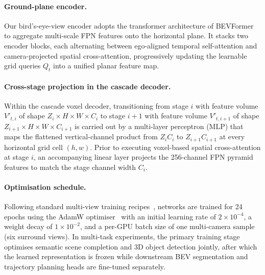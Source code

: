 \paragraph{Ground-plane encoder.} Our bird's-eye-view encoder adopts the transformer architecture of BEVFormer~\cite{li2022bevformer} to aggregate multi-scale FPN features onto the horizontal plane. It stacks two encoder blocks, each alternating between ego-aligned temporal self-attention and camera-projected spatial cross-attention, progressively updating the learnable grid queries $Q_t$ into a unified planar feature map.

\paragraph{Cross-stage projection in the cascade decoder.} Within the cascade voxel decoder, transitioning from stage $i$ with feature volume $V'_{t,i}$ of shape $Z_i\times H\times W\times C_i$ to stage $i+1$ with feature volume $V'_{t,i+1}$ of shape $Z_{i+1}\times H\times W\times C_{i+1}$ is carried out by a multi-layer perceptron (MLP) that maps the flattened vertical-channel product from $Z_i C_i$ to $Z_{i+1} C_{i+1}$ at every horizontal grid cell $(h,w)$. Prior to executing voxel-based spatial cross-attention at stage $i$, an accompanying linear layer projects the 256-channel FPN pyramid features to match the stage channel width $C_i$.

\paragraph{Optimisation schedule.} Following standard multi-view training recipes~\cite{li2022bevformer,wang2021fcos3d}, networks are trained for 24 epochs using the AdamW optimiser~\cite{loshchilov2017decoupled} with an initial learning rate of $2\times10^{-4}$, a weight decay of $1\times10^{-2}$, and a per-GPU batch size of one multi-camera sample (six surround views). In multi-task experiments, the primary training stage optimises semantic scene completion and 3D object detection jointly, after which the learned representation is frozen while downstream BEV segmentation and trajectory planning heads are fine-tuned separately.

